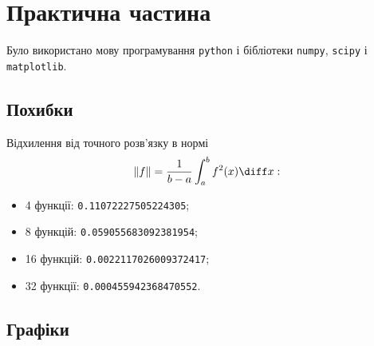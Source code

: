 \section{Практична частина}
Було використано мову програмування \verb|python| і бібліотеки \verb|numpy|, \verb|scipy| і \verb|matplotlib|.

\subsection{Похибки}
Відхилення від точного розв'язку в нормі 
\begin{equation}
    \|f\| = \frac{1}{b - a} \int_a^b f^2(x) \diff x:
\end{equation}
\begin{itemize}
    \item 4 функції: \texttt{0.11072227505224305};
    \item 8 функцій: \texttt{0.059055683092381954};
    \item 16 функцій: \texttt{0.0022117026009372417};
    \item 32 функції: \texttt{0.000455942368470552}.
\end{itemize}

\subsection{Графіки}

